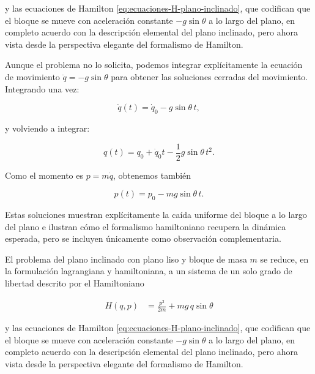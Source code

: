 \documentclass{article}
\begin{document}
y las ecuaciones de Hamilton \eqref{eq:ecuaciones-H-plano-inclinado}, que codifican
que el bloque se mueve con aceleración constante \(-g\sin\theta\) a lo largo del
plano, en completo acuerdo con la descripción elemental del plano inclinado, pero
ahora vista desde la perspectiva elegante del formalismo de Hamilton.

Aunque el problema no lo solicita, podemos integrar explícitamente la ecuación
de movimiento \(\ddot q = -g\sin\theta\) para obtener las soluciones cerradas del
movimiento. Integrando una vez:

\[
\dot q(t) = \dot q_0 - g\sin\theta\, t,
\]

y volviendo a integrar:

\[
q(t) = q_0 + \dot q_0 t - \frac{1}{2}g\sin\theta\, t^{2}.
\]

Como el momento es \(p = m\dot q\), obtenemos también

\[
p(t) = p_0 - m g\sin\theta\, t.
\]

Estas soluciones muestran explícitamente la caída uniforme del bloque a lo largo
del plano e ilustran cómo el formalismo hamiltoniano recupera la dinámica esperada,
pero se incluyen únicamente como observación complementaria.
\vspace{0.4cm}

El problema del plano inclinado con plano liso y bloque de masa
\(m\) se reduce, en la formulación lagrangiana y hamiltoniana, a un sistema de un
solo grado de libertad descrito por el Hamiltoniano

\begin{equation}
\begin{split}
H(q,p)
&= \frac{p^{2}}{2m} + m g\,q\sin\theta
\end{split}\label{eq:H-plano-inclinado-resumen}
\end{equation}

y las ecuaciones de Hamilton \eqref{eq:ecuaciones-H-plano-inclinado}, que codifican
que el bloque se mueve con aceleración constante \(-g\sin\theta\) a lo largo del
plano, en completo acuerdo con la descripción elemental del plano inclinado, pero
ahora vista desde la perspectiva elegante del formalismo de Hamilton.

\vspace{0.5cm}


\end{document}
